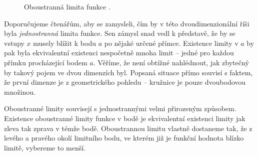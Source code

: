 \begin{figure}[ht]
 \centering

 \caption{Oboustranná limita funkce .}
 \label{fig:oboustranna-limita-ve-2D}
\end{figure}

Doporučujeme čtenářům, aby se zamysleli, čím by v této dvoudimenzionální říši
byla \emph{jednostranná} limita funkce. Sen zámysl snad vedl k představě, že by
se vstupy $x$ musely blížit k bodu $a$ po nějaké určené přímce. Existence
 limity v $a$ by pak byla ekvivalentní existenci nespočetně mnoha
 limit -- jedné pro každou přímku procházející bodem $a$.
Věříme, že není obtížné nahlédnout, jak zbytečný by takový pojem ve dvou
dimenzích byl. Popsaná situace přímo souvisí s faktem, že první dimenze je z
geometrického pohledu  -- kružnice je pouze dvoubodovou
množinou.

Oboustranné limity souvisejí s jednostrannými velmi přirozeným způsobem.
Existence oboustran\-né limity funkce v bodě je ekvivalentní existenci limity
jak zleva tak zprava v témže bodě. Oboustrannou limitu vlastně dostaneme tak, že
z levého a pravého okolí limitního bodu, ve kterém již je funkční hodnota blízko
limitě, vybereme to menší.

